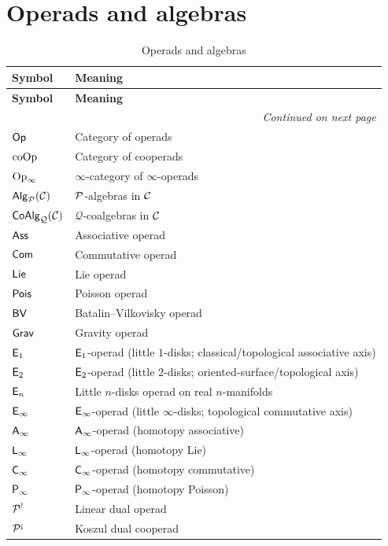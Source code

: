 \section{Operads and algebras}
\label{sec:notation-operads}

\begin{longtable}{p{3cm} p{10cm}}
\caption{Operads and algebras} \\
\toprule
\textbf{Symbol} & \textbf{Meaning} \\
\midrule
\endfirsthead
\toprule
\textbf{Symbol} & \textbf{Meaning} \\
\midrule
\endhead
\midrule
\multicolumn{2}{r}{\textit{Continued on next page}} \\
\endfoot
\bottomrule
\endlastfoot

$\mathsf{Op}$ & Category of operads \\
$\mathrm{coOp}$ & Category of cooperads \\
$\mathrm{Op}_\infty$ & $\infty$-category of $\infty$-operads \\
$\mathsf{Alg}_{\mathcal{P}}(\mathcal{C})$ & $\mathcal{P}$-algebras in $\mathcal{C}$ \\
$\mathsf{CoAlg}_{\mathcal{Q}}(\mathcal{C})$ & $\mathcal{Q}$-coalgebras in $\mathcal{C}$ \\
$\mathsf{Ass}$ & Associative operad \\
$\mathsf{Com}$ & Commutative operad \\
$\mathsf{Lie}$ & Lie operad \\
$\mathsf{Pois}$ & Poisson operad \\
$\mathsf{BV}$ & Batalin--Vilkovisky operad \\
$\mathsf{Grav}$ & Gravity operad \\
$\mathsf{E}_1$ & $\mathsf{E}_1$-operad (little $1$-disks; classical/topological associative axis) \\
$\mathsf{E}_2$ & $\mathsf{E}_2$-operad (little $2$-disks; oriented-surface/topological axis) \\
$\mathsf{E}_n$ & Little $n$-disks operad on real $n$-manifolds \\
$\mathsf{E}_{\infty}$ & $\mathsf{E}_{\infty}$-operad (little $\infty$-disks; topological commutative axis) \\
$\mathsf{A}_{\infty}$ & $\mathsf{A}_{\infty}$-operad (homotopy associative) \\
$\mathsf{L}_{\infty}$ & $\mathsf{L}_{\infty}$-operad (homotopy Lie) \\
$\mathsf{C}_{\infty}$ & $\mathsf{C}_{\infty}$-operad (homotopy commutative) \\
$\mathsf{P}_{\infty}$ & $\mathsf{P}_{\infty}$-operad (homotopy Poisson) \\
$\mathcal{P}^!$ & Linear dual operad \\
$\cP^{\scriptstyle \text{\textexclamdown}}$ & Koszul dual cooperad \\

\end{longtable}
